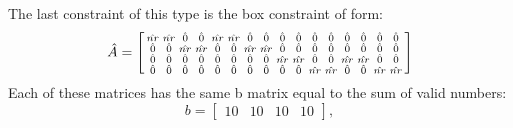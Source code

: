 \documentclass[12pt]{article}
\begin{document}
The last constraint of this type is the box constraint of form:
$$
\hat{A} =
\begin{bsmallmatrix}
\hat{nr} & \hat{nr} & \hat{0} & \hat{0} & \hat{nr} & \hat{nr} & \hat{0} & \hat{0} & \hat{0} & \hat{0} & \hat{0} & \hat{0} & \hat{0} & \hat{0} & \hat{0} & \hat{0} \\
\hat{0} & \hat{0} & \hat{nr} & \hat{nr} & \hat{0} & \hat{0} & \hat{nr} & \hat{nr} & \hat{0} & \hat{0} & \hat{0} & \hat{0} & \hat{0} & \hat{0} & \hat{0} & \hat{0} \\
\hat{0} & \hat{0} & \hat{0} & \hat{0} & \hat{0} & \hat{0} & \hat{0} & \hat{0} & \hat{nr} & \hat{nr} & \hat{0} & \hat{0} & \hat{nr} & \hat{nr} & \hat{0} & \hat{0} \\
\hat{0} & \hat{0} & \hat{0} & \hat{0} & \hat{0} & \hat{0} & \hat{0} & \hat{0} & \hat{0} & \hat{0} & \hat{nr} & \hat{nr} & \hat{0} & \hat{0} & \hat{nr} & \hat{nr} \\
\end{bsmallmatrix}
$$
Each of these matrices has the same b matrix equal to the sum of valid numbers:
$$
b = 
\begin{bmatrix}
10 & 10 & 10 & 10
\end{bmatrix},
$$
\end{document}
